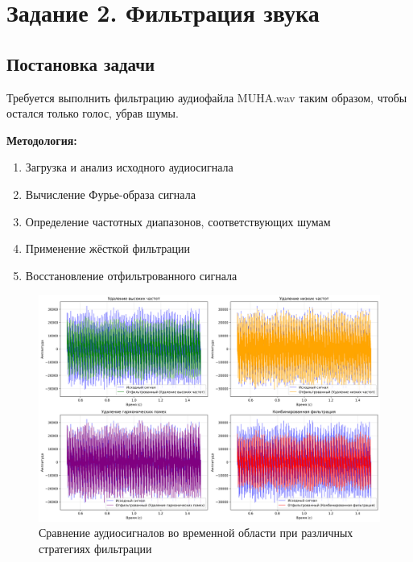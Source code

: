\section*{Задание 2. Фильтрация звука}

\subsection*{Постановка задачи}

Требуется выполнить фильтрацию аудиофайла MUHA.wav таким образом, чтобы остался только голос, убрав шумы.

\textbf{Методология:}
\begin{enumerate}
    \item Загрузка и анализ исходного аудиосигнала
    \item Вычисление Фурье-образа сигнала
    \item Определение частотных диапазонов, соответствующих шумам
    \item Применение жёсткой фильтрации
    \item Восстановление отфильтрованного сигнала
\end{enumerate}

\begin{figure}[H]
\centering
\includegraphics[width=\textwidth]{images/task2/audio_filter_time_domain.png}
\caption{Сравнение аудиосигналов во временной области при различных стратегиях фильтрации}
\end{figure}

